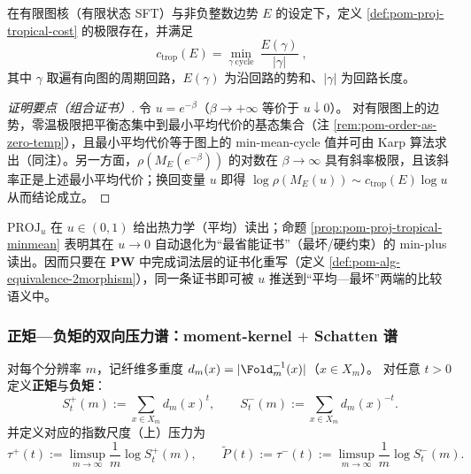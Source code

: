 \begin{proposition}[热带化极限=最小平均回路能量]\label{prop:pom-proj-tropical-minmean}
在有限图核（有限状态 SFT）与非负整数边势 \(E\) 的设定下，定义 \ref{def:pom-proj-tropical-cost} 的极限存在，并满足
$$
\boxed{\;
c_{\mathrm{trop}}(E)
=
\min_{\gamma\ \mathrm{cycle}}\ \frac{E(\gamma)}{|\gamma|}\;},
$$
其中 \(\gamma\) 取遍有向图的周期回路，\(E(\gamma)\) 为沿回路的势和、\(|\gamma|\) 为回路长度。
\end{proposition}
\begin{proof}[证明要点（组合证书）]
令 \(u=e^{-\beta}\)（\(\beta\to+\infty\) 等价于 \(u\downarrow 0\)）。
对有限图上的边势，零温极限把平衡态集中到最小平均代价的基态集合（注 \ref{rem:pom-order-as-zero-temp}），且最小平均代价等于图上的 min-mean-cycle 值并可由 Karp 算法求出（同注）。另一方面，\(\rho(M_E(e^{-\beta}))\) 的对数在 \(\beta\to\infty\) 具有斜率极限，且该斜率正是上述最小平均代价；换回变量 \(u\) 即得
\(
\log\rho(M_E(u))\sim c_{\mathrm{trop}}(E)\log u
\)
从而结论成立。
\end{proof}

\begin{remark}[同一门族统一平均/最坏]\label{rem:pom-proj-avg-worst-unified}
\(\mathrm{PROJ}_u\) 在 \(u\in(0,1)\) 给出热力学（平均）读出；命题 \ref{prop:pom-proj-tropical-minmean} 表明其在 \(u\to 0\) 自动退化为“最省能证书”（最坏/硬约束）的 min-plus 读出。因而只要在 \(\mathbf{PW}\) 中完成词法层的证书化重写（定义 \ref{def:pom-alg-equivalence-2morphism}），同一条证书即可被 \(u\) 推送到“平均—最坏”两端的比较语义中。
\end{remark}

\subsubsection{正矩—负矩的双向压力谱：moment-kernel \texorpdfstring{$+$}{+} Schatten 谱}\label{subsec:pom-bidirectional-pressure}
\begin{definition}[双向矩与双向压力]\label{def:pom-bidirectional-moments}
对每个分辨率 \(m\)，记纤维多重度 \(d_m(x)=|\Fold_m^{-1}(x)|\)（\(x\in X_m\)）。
对任意 \(t>0\) 定义\textbf{正矩}与\textbf{负矩}：
$$
S^{+}_{t}(m):=\sum_{x\in X_m} d_m(x)^{t},
\qquad
S^{-}_{t}(m):=\sum_{x\in X_m} d_m(x)^{-t}.
$$
并定义对应的指数尺度（上）压力为
$$
\tau^{+}(t):=\limsup_{m\to\infty}\frac{1}{m}\log S^{+}_{t}(m),
\qquad
\widetilde P(t):=\tau^{-}(t):=\limsup_{m\to\infty}\frac{1}{m}\log S^{-}_{t}(m).
$$
\end{definition}

